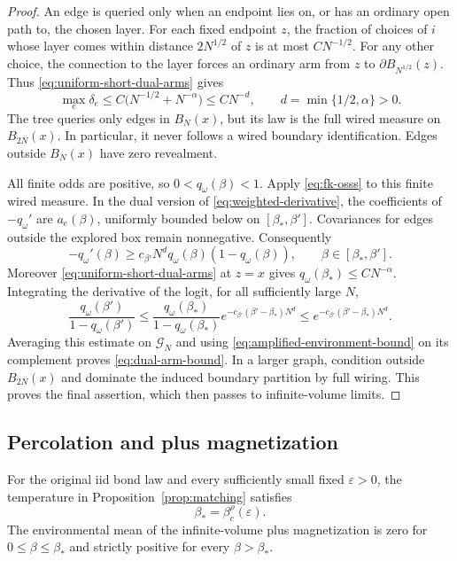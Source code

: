 \begin{proof}
An edge is queried only when an endpoint lies on, or has an ordinary
open path to, the chosen layer. For each fixed endpoint $z$, the
fraction of choices of $i$ whose layer comes within distance
$2N^{1/2}$ of $z$ is at most $C N^{-1/2}$. For any other choice,
the connection to the layer forces an ordinary arm from $z$ to
$\partial B_{N^{1/2}}(z)$. Thus
\eqref{eq:uniform-short-dual-arms} gives
\begin{equation}
 \max_e\delta_e
       \le C\bigl(N^{-1/2}+N^{-\alpha}\bigr)
       \le C N^{-d},\qquad d=\min\{1/2,\alpha\}>0.
 \label{eq:layer-revealment}
\end{equation}
The tree queries only edges in $B_N(x)$, but its law is the full
wired measure on $B_{2N}(x)$. In particular, it never follows a
wired boundary identification. Edges outside $B_N(x)$ have zero
revealment.

All finite odds are positive, so $0<q_\omega(\beta)<1$.
Apply \eqref{eq:fk-osss} to this finite wired measure. In the
dual version of \eqref{eq:weighted-derivative}, the coefficients
of $-q_\omega'$ are $a_e(\beta)$, uniformly bounded below on
$[\beta_*,\beta']$. Covariances for edges outside the explored
box remain nonnegative. Consequently
\begin{equation}
 -q_\omega'(\beta)
       \ge c_{\beta'} N^d q_\omega(\beta)(1-q_\omega(\beta)),
       \qquad \beta\in[\beta_*,\beta'].
 \label{eq:dual-differential-inequality}
\end{equation}
Moreover \eqref{eq:uniform-short-dual-arms} at $z=x$ gives
$q_\omega(\beta_*)\le C N^{-\alpha}$. Integrating the derivative
of the logit, for all sufficiently large $N$,
\[
 \frac{q_\omega(\beta')}{1-q_\omega(\beta')}
 \le\frac{q_\omega(\beta_*)}{1-q_\omega(\beta_*)}
       e^{-c_{\beta'}(\beta'-\beta_*)N^d}
 \le e^{-c_{\beta'}(\beta'-\beta_*)N^d}.
\]
Averaging this estimate on $\mathcal G_N$ and using
\eqref{eq:amplified-environment-bound} on its complement proves
\eqref{eq:dual-arm-bound}. In a larger graph, condition outside
$B_{2N}(x)$ and dominate the induced boundary partition by full
wiring. This proves the final assertion, which then passes to
infinite-volume limits.
\end{proof}

\subsection{Percolation and plus magnetization}

\begin{proposition}
\label{prop:physical-criticality}
For the original iid bond law and every sufficiently small fixed
$\varepsilon>0$, the temperature in
Proposition~\ref{prop:matching} satisfies
\begin{equation}
                    \beta_* = \beta_c^\rho(\varepsilon).
 \label{eq:physical-critical-point}
\end{equation}
The environmental mean of the infinite-volume plus magnetization
is zero for $0\le\beta\le\beta_*$ and strictly positive for every
$\beta>\beta_*$.
\end{proposition}

